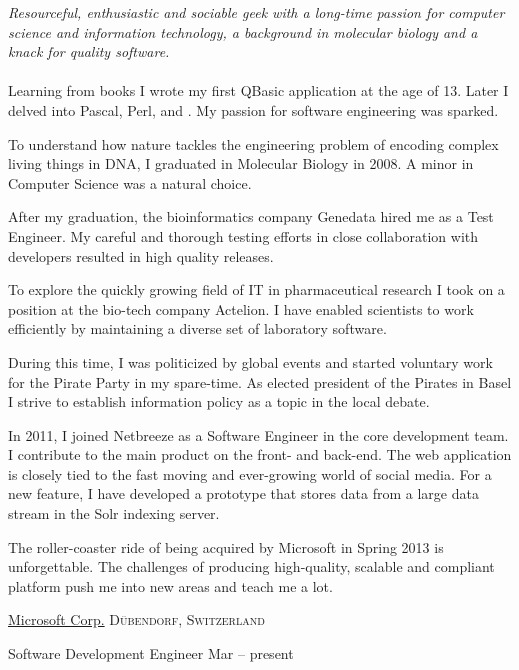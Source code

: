 \documentclass[10pt,a4paper]{article}
\begin{document}
\vspace{-1.3em}  %
\begin{multicols}{2}  %
\noindent \emph{Resourceful, enthusiastic and sociable geek with a long-time passion for computer science and information technology, a background in molecular biology and a knack for quality software.}
\\
\\
Learning from books I wrote my first QBasic application at the age of 13. Later I delved into Pascal, Perl,  and . My passion for software engineering was sparked.

To understand how nature tackles the engineering problem of encoding complex living things in DNA, I graduated in Molecular Biology in 2008. A minor in Computer Science was a natural choice.

After my graduation, the bioinformatics company Genedata hired me as a Test Engineer. My careful and thorough testing efforts in close collaboration with developers resulted in high quality releases.

To explore the quickly growing field of IT in pharmaceutical research I took on a position at the bio-tech company Actelion. I have enabled scientists to work efficiently by maintaining a diverse set of laboratory software. 

During this time, I was politicized by global events and started voluntary work for the Pirate Party in my spare-time. As elected president of the Pirates in Basel I strive to establish information policy as a topic in the local debate.

In 2011, I joined Netbreeze as a Software Engineer in the core development team. I contribute to the main product on the front- and back-end. The web application is closely tied to the fast moving and ever-growing world of social media. For a new feature, I have developed a prototype that stores data from a large data stream in the Solr indexing server.

The roller-coaster ride of being acquired by Microsoft in Spring 2013 is unforgettable. The challenges of producing high-quality, scalable and compliant platform push me into new areas and teach me a lot. 
\end{multicols}


\spacedhrule{0em}{-0.4em}


\headedsection  %
  {\href{http://microsoft.com/}{Microsoft Corp.}}
  {\textsc{D\"ubendorf, Switzerland}} {%

  \headedsubsection  %
    {Software Development Engineer}
    {Mar  -- present}
    {}
}
\end{document}
